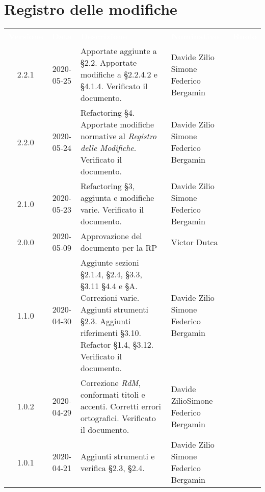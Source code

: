 \section*{Registro delle modifiche}
{
	\centering
	\begin{longtable}{ c c  C{4cm}  C{3.8cm}  C{3cm} }
		\textcolor{white}{\textbf{Versione}} & \textcolor{white}{\textbf{Data}} & \textcolor{white}{\textbf{Descrizione}} & \textcolor{white}{\textbf{Nominativo}} & \textcolor{white}{\textbf{Ruolo}}\\
		2.2.1 & 2020-05-25 & Apportate aggiunte a \S 2.2. Apportate modifiche a \S 2.2.4.2 e \S 4.1.4. Verificato il documento. & Davide Zilio \newline Simone Federico Bergamin & \adm{} \newline  \ver{} \\
		2.2.0 & 2020-05-24 & Refactoring \S 4. Apportate modifiche normative al \textit{Registro delle Modifiche}. Verificato il documento. & Davide Zilio \newline Simone Federico Bergamin & \adm{} \newline  \ver{} \\
	2.1.0 & 2020-05-23 & Refactoring \S 3, aggiunta e modifiche varie. Verificato il documento. & Davide Zilio \newline Simone Federico Bergamin & \adm{} \newline  \ver{} \\
	2.0.0 & 2020-05-09 & Approvazione del documento per la RP & Victor Dutca &\Res{}\\
	1.1.0 & 2020-04-30 & Aggiunte sezioni \S 2.1.4, \S 2.4, \S 3.3, \S 3.11 \S 4.4 e \S A. Correzioni varie. Aggiunti strumenti \S 2.3. Aggiunti riferimenti \S 3.10. Refactor \S 1.4, \S 3.12. Verificato il documento. & Davide Zilio \newline Simone Federico Bergamin&\adm{} \newline  \ver{}\\
	1.0.2 & 2020-04-29 & Correzione \textit{RdM}, conformati titoli e accenti. Corretti errori ortografici. Verificato il documento. & Davide Zilio\newline Simone Federico Bergamin &\adm{} \newline  \ver{}\\
	1.0.1 & 2020-04-21 & Aggiunti strumenti e verifica \S 2.3, \S 2.4. & Davide Zilio \newline Simone Federico Bergamin &\adm{} \newline  \ver{}\\	

\end{longtable}}
